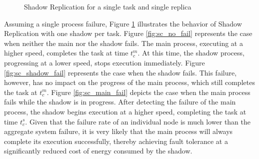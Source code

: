 \begin{figure}[!t]
	\begin{center}
	\end{center}
	\caption{Shadow Replication for a single task and single replica}
	\label{fig:sc_overview}
\end{figure}

Assuming a single process failure, Figure \ref{fig:sc_overview} illustrates the behavior of Shadow Replication with one shadow per task. 
Figure \ref{fig:sc_no_fail} represents the case when neither the main nor the shadow fails. The main process, executing
at a higher speed, completes the task at time $t_c^m$. At this time, the shadow process, progressing at a lower speed, stops execution immediately. Figure \ref{fig:sc_shadow_fail} represents the case when the shadow fails. This failure, however, has no impact on the progress of the main process, which still completes the task at $t_c^m$. Figure \ref{fig:sc_main_fail} depicts the case when the main process fails while the shadow is in progress. After detecting the failure of the main process, the shadow begins execution at a higher speed, completing the task at time $t_c^s$. Given that the failure rate of an individual node is much lower than
the aggregate system failure, it is very likely that the main process
will always complete its execution successfully, thereby achieving fault tolerance at a significantly reduced cost of energy consumed by the shadow. %


